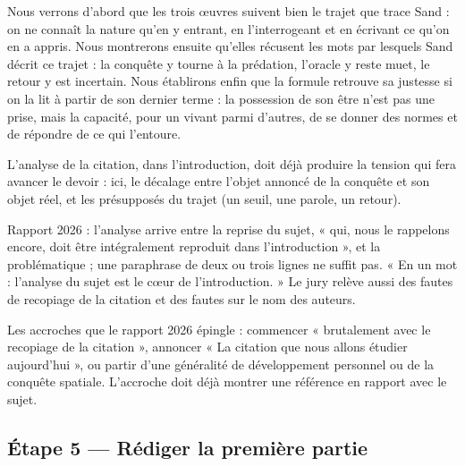 \documentclass[11pt,a4paper]{article}
\begin{document}
Nous verrons d'abord que les trois œuvres suivent bien le trajet que trace Sand : on ne connaît la nature qu'en y entrant, en l'interrogeant et en écrivant ce qu'on en a appris. Nous montrerons ensuite qu'elles récusent les mots par lesquels Sand décrit ce trajet : la conquête y tourne à la prédation, l'oracle y reste muet, le retour y est incertain. Nous établirons enfin que la formule retrouve sa justesse si on la lit à partir de son dernier terme : la possession de son être n'est pas une prise, mais la capacité, pour un vivant parmi d'autres, de se donner des normes et de répondre de ce qui l'entoure.

\begin{methode}

L'analyse de la citation, dans l'introduction, doit déjà produire la tension qui fera avancer le devoir : ici, le décalage entre l'objet annoncé de la conquête et son objet réel, et les présupposés du trajet (un seuil, une parole, un retour).

\end{methode}

\begin{jury}

Rapport 2026 : l'analyse arrive entre la reprise du sujet, « qui, nous le rappelons encore, doit être intégralement reproduit dans l'introduction », et la problématique ; une paraphrase de deux ou trois lignes ne suffit pas. « En un mot : l'analyse du sujet est le cœur de l'introduction. » Le jury relève aussi des fautes de recopiage de la citation et des fautes sur le nom des auteurs.

\end{jury}

\begin{piege}

Les accroches que le rapport 2026 épingle : commencer « brutalement avec le recopiage de la citation », annoncer « La citation que nous allons étudier aujourd'hui », ou partir d'une généralité de développement personnel ou de la conquête spatiale. L'accroche doit déjà montrer une référence en rapport avec le sujet.

\end{piege}

\hypertarget{uxe9tape-5-ruxe9diger-la-premiuxe8re-partie}{%
\subsection{Étape 5 --- Rédiger la première partie}\label{uxe9tape-5-ruxe9diger-la-premiuxe8re-partie}}
\end{document}
